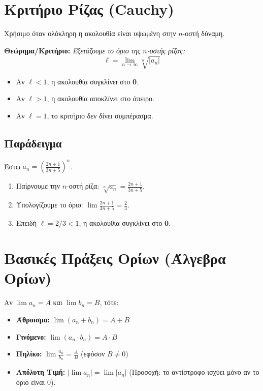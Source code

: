 \documentclass[11pt,a4paper]{article}
\newcommand{\eng}[1]{\selectlanguage{english}#1\selectlanguage{greek}}
\newenvironment{criterion}
    {\vspace{10pt}\noindent\textbf{Θεώρημα/Κριτήριο:}\itshape}
    {\vspace{10pt}}
\begin{document}
\section{Κριτήριο Ρίζας (\eng{Cauchy})}

Χρήσιμο όταν ολόκληρη η ακολουθία είναι υψωμένη στην $n$-οστή δύναμη.

\begin{criterion}
Εξετάζουμε το όριο της $n$-οστής ρίζας:
\[ \ell = \lim_{n \to \infty} \sqrt[n]{|a_n|} \]
\begin{itemize}
    \item Αν $\ell < 1$, η ακολουθία συγκλίνει στο \textbf{0}.
    \item Αν $\ell > 1$, η ακολουθία αποκλίνει στο άπειρο.
    \item Αν $\ell = 1$, το κριτήριο δεν δίνει συμπέρασμα.
\end{itemize}
\end{criterion}

\subsection*{Παράδειγμα}
Έστω $a_n = \left( \frac{2n+1}{3n+5} \right)^n$.

\begin{enumerate}
    \item Παίρνουμε την $n$-οστή ρίζα: $\sqrt[n]{a_n} = \frac{2n+1}{3n+5}$.
    \item Υπολογίζουμε το όριο: $\lim \frac{2n+1}{3n+5} = \frac{2}{3}$.
    \item Επειδή $\ell = 2/3 < 1$, η ακολουθία συγκλίνει στο \textbf{0}.
\end{enumerate}

\section{Βασικές Πράξεις Ορίων (Άλγεβρα Ορίων)}

Αν $\lim a_n = A$ και $\lim b_n = B$, τότε:
\begin{itemize}
    \item \textbf{Άθροισμα:} $\lim (a_n + b_n) = A + B$
    \item \textbf{Γινόμενο:} $\lim (a_n \cdot b_n) = A \cdot B$
    \item \textbf{Πηλίκο:} $\lim \frac{a_n}{b_n} = \frac{A}{B}$ (εφόσον $B \ne 0$)
    \item \textbf{Απόλυτη Τιμή:} $|\lim a_n| = \lim |a_n|$ (Προσοχή: το αντίστροφο ισχύει μόνο αν το όριο είναι 0).
\end{itemize}
\end{document}
